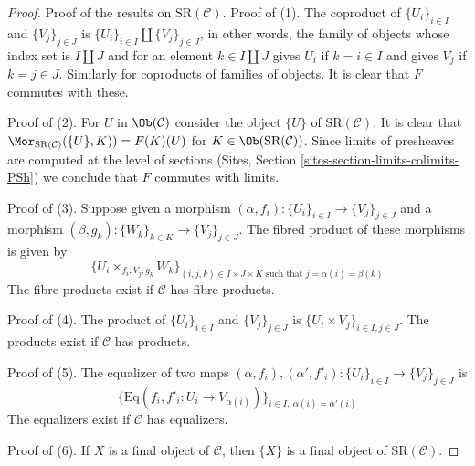 \begin{proof}
Proof of the results on $\text{SR}(\mathcal{C})$.
Proof of (1). The coproduct of $\{U_i\}_{i \in I}$ and $\{V_j\}_{j \in J}$ is
$\{U_i\}_{i \in I} \amalg \{V_j\}_{j \in J}$, in other words, the family
of objects whose index set is $I \amalg J$ and for an element
$k \in I \amalg J$ gives $U_i$ if $k = i \in I$ and gives $V_j$ if
$k = j \in J$. Similarly for coproducts
of families of objects. It is clear that $F$ commutes with these.

\medskip\noindent
Proof of (2). For $U$ in $\Ob(\mathcal{C})$ consider the object $\{U\}$ of
$\text{SR}(\mathcal{C})$. It is clear that
$\Mor_{\text{SR}(\mathcal{C})}(\{U\}, K)) = F(K)(U)$
for $K \in \Ob(\text{SR}(\mathcal{C}))$. Since limits of presheaves
are computed at the level of sections
(Sites, Section \ref{sites-section-limits-colimits-PSh})
we conclude that $F$ commutes with limits.

\medskip\noindent
Proof of (3). Suppose given a morphism
$(\alpha, f_i) : \{U_i\}_{i \in I} \to \{V_j\}_{j \in J}$
and a morphism
$(\beta, g_k) : \{W_k\}_{k \in K} \to \{V_j\}_{j \in J}$.
The fibred product of these morphisms is given by
$$
\{ U_i \times_{f_i, V_j, g_k} W_k\}_{(i, j, k) \in I \times J \times K
\text{ such that } j = \alpha(i) = \beta(k)}
$$
The fibre products exist if $\mathcal{C}$ has fibre products.

\medskip\noindent
Proof of (4). The product of $\{U_i\}_{i \in I}$ and $\{V_j\}_{j \in J}$ is
$\{U_i \times V_j\}_{i \in I, j \in J}$. The products exist if
$\mathcal{C}$ has products.

\medskip\noindent
Proof of (5). The equalizer of two maps
$(\alpha, f_i), (\alpha', f'_i) : \{U_i\}_{i \in I} \to \{V_j\}_{j \in J}$
is
$$
\{
\text{Eq}(f_i, f'_i : U_i \to V_{\alpha(i)})
\}_{i \in I,\ \alpha(i) = \alpha'(i)}
$$
The equalizers exist if $\mathcal{C}$ has equalizers.

\medskip\noindent
Proof of (6). If $X$ is a final object of $\mathcal{C}$, then
$\{X\}$ is a final object of $\text{SR}(\mathcal{C})$.


\end{proof}
